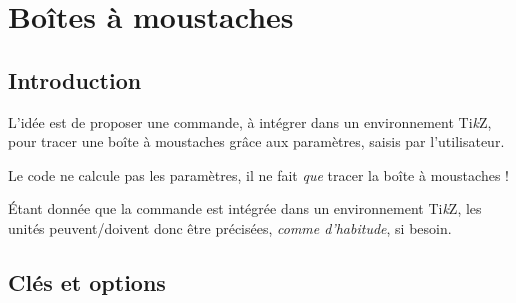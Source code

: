 \documentclass[a4paper,french,11pt]{article}
\providecommand\tikzlogo{Ti\textit{k}Z}
\let\TikZ\tikzlogo
\begin{document}
\begin{codesortie}
\def\LLX{1994,1995,1996,1997,1998,1999,2000,2001,2002,2004,2005,2006,2007,2008,2009,2010}
\def\LLY{1718,1710,1708,1700,1698,1697,1691,1688,1683,1679,1671,1670,1663,1661,1656,1649}

\end{codesortie}

\newpage

\section{Boîtes à moustaches}\label{boiteamoustaches}

\subsection{Introduction}

\begin{codeidee}
L'idée est de proposer une commande, à intégrer dans un environnement \TikZ, pour tracer une boîte à moustaches grâce aux paramètres, saisis par l'utilisateur.

\smallskip

Le code ne calcule pas les paramètres, il ne fait \textit{que} tracer la boîte à moustaches !
\end{codeidee}

\begin{codetex}[]
\end{codetex}

\begin{codeinfo}
Étant donnée que la commande est intégrée dans un environnement \TikZ, les unités peuvent/doivent donc être précisées, \textit{comme d'habitude}, si besoin.
\end{codeinfo}

\subsection{Clés et options}
\end{document}
